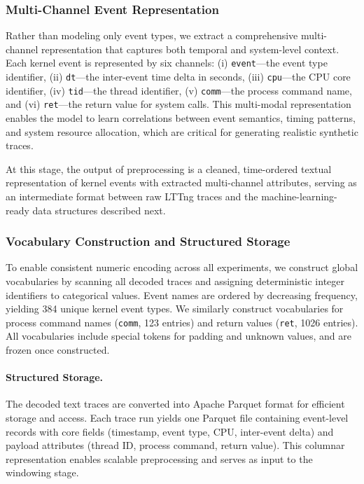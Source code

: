 \subsubsection{Multi-Channel Event Representation}
\label{sec:multi-channel}
Rather than modeling only event types, we extract a comprehensive multi-channel representation that captures both temporal and system-level context. Each kernel event is represented by six channels: (i) \texttt{event}---the event type identifier, (ii) \texttt{dt}---the inter-event time delta in seconds, (iii) \texttt{cpu}---the CPU core identifier, (iv) \texttt{tid}---the thread identifier, (v) \texttt{comm}---the process command name, and (vi) \texttt{ret}---the return value for system calls. This multi-modal representation enables the model to learn correlations between event semantics, timing patterns, and system resource allocation, which are critical for generating realistic synthetic traces.

At this stage, the output of preprocessing is a cleaned, time-ordered textual representation of kernel events with extracted multi-channel attributes, serving as an intermediate format between raw LTTng traces and the machine-learning-ready data structures described next.





\subsubsection{Vocabulary Construction and Structured Storage}
\label{sec:parquet}

To enable consistent numeric encoding across all experiments, we construct global vocabularies by scanning all decoded traces and assigning deterministic integer identifiers to categorical values. Event names are ordered by decreasing frequency, yielding 384 unique kernel event types. We similarly construct vocabularies for process command names (\texttt{comm}, 123 entries) and return values (\texttt{ret}, 1026 entries). All vocabularies include special tokens for padding and unknown values, and are frozen once constructed.

\paragraph{Structured Storage.}
The decoded text traces are converted into Apache Parquet format for efficient storage and access. Each trace run yields one Parquet file containing event-level records with core fields (timestamp, event type, CPU, inter-event delta) and payload attributes (thread ID, process command, return value). This columnar representation enables scalable preprocessing and serves as input to the windowing stage.

